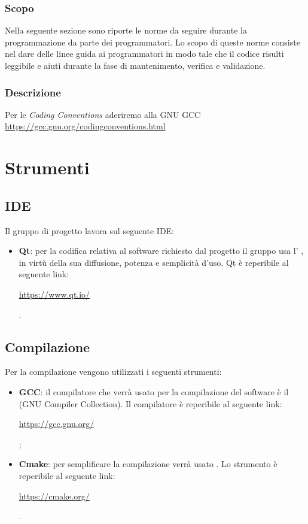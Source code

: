 \documentclass[../NomeDocumento.tex]{subfiles}
\begin{document}
	\subsubsection{Scopo}
	
	Nella seguente sezione sono riporte le norme da seguire durante la programmazione da parte dei programmatori. Lo scopo di queste norme consiste nel dare delle linee guida ai programmatori in modo tale che il codice risulti leggibile e aiuti durante la fase di mantenimento, verifica e validazione.

	\subsubsection{Descrizione}
	
	Per le \emph{Coding Conventions} aderiremo alla GNU GCC \url{https://gcc.gnu.org/codingconventions.html}
	
\section{Strumenti}

\subsection{IDE}

Il gruppo di progetto lavora sul seguente IDE:

\begin{itemize}
	\item \textbf{Qt}: per la codifica relativa al software richiesto dal progetto il gruppo usa l' , in virtù della sua diffusione, potenza e semplicità d'uso. Qt è reperibile al seguente link: \\ \centerline{\url{https://www.qt.io/}}.
\end{itemize}

\subsection{Compilazione}

Per la compilazione vengono utilizzati i seguenti strumenti:

\begin{itemize}
	\item \textbf{GCC}: il compilatore che verrà usato per la compilazione del software è il  (GNU Compiler Collection). Il compilatore è reperibile al seguente link: \\ \centerline{\url{https://gcc.gnu.org/}};
	
	\item \textbf{Cmake}: per semplificare la compilazione verrà usato . Lo strumento è reperibile al seguente link: \\ \centerline{\url{https://cmake.org/}}.
\end{itemize}
\end{document}
